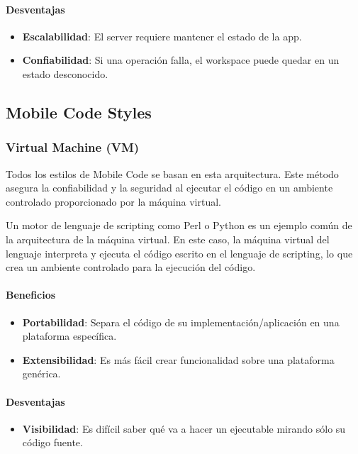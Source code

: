 \documentclass{article}
\begin{document}
		\paragraph{Desventajas}
		\begin{itemize}	
			\item {\textbf{Escalabilidad}}: El server requiere mantener el estado de la app.
			
			\item {\textbf{Confiabilidad}}: Si una operación falla, el workspace puede quedar en un estado desconocido.
			
		\end{itemize}
		
		
		\subsection{Mobile Code Styles}
		\subsubsection{Virtual Machine (VM)}
		Todos los estilos de Mobile Code se basan en esta arquitectura. Este método asegura la confiabilidad y la seguridad al ejecutar el código en un ambiente controlado proporcionado por la máquina virtual.
		
		Un motor de lenguaje de scripting como Perl o Python es un ejemplo común de la arquitectura de la máquina virtual. En este caso, la máquina virtual del lenguaje interpreta y ejecuta el código escrito en el lenguaje de scripting, lo que crea un ambiente controlado para la ejecución del código.
		
		\paragraph{Beneficios}
		\begin{itemize}	
			\item {\textbf{Portabilidad}}: Separa el código de su implementación/aplicación en
			una plataforma específica.
			
			\item {\textbf{Extensibilidad}}: Es más fácil crear funcionalidad sobre una plataforma
			genérica.
			
		\end{itemize}
		
		\paragraph{Desventajas}
		\begin{itemize}	
			\item {\textbf{Visibilidad}}: Es difícil saber qué va a hacer un ejecutable mirando
			sólo su código fuente.			
		\end{itemize}
\end{document}
